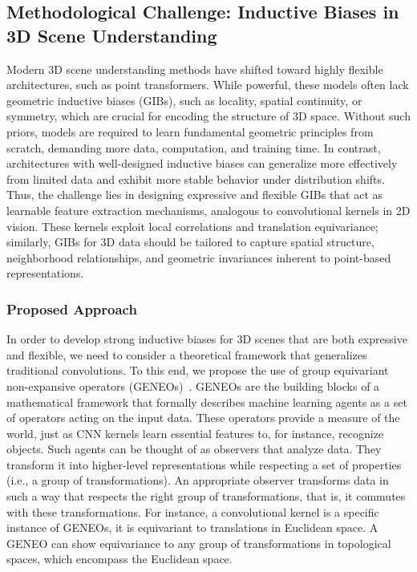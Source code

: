 \subsection{Methodological Challenge: Inductive Biases in 3D Scene Understanding}
%
Modern 3D scene understanding methods have shifted toward highly flexible
architectures, such as point transformers. While powerful, these models often
lack geometric inductive biases (GIBs), such as locality, spatial continuity,
or symmetry, which are crucial for encoding the structure of 3D space.
%
Without such priors, models are required to learn fundamental geometric
principles from scratch, demanding more data, computation, and training time.
In contrast, architectures with well-designed inductive biases can generalize
more effectively from limited data and exhibit more stable behavior under
distribution shifts.
%
Thus, the challenge lies in designing expressive and flexible GIBs that act as
learnable feature extraction mechanisms, analogous to convolutional kernels in
2D vision.
%
These kernels exploit local correlations and translation equivariance;
similarly, GIBs for 3D data should be tailored to capture spatial structure,
neighborhood relationships, and geometric invariances inherent to point-based
representations.

\subsubsection{Proposed Approach}
%
In order to develop strong inductive biases for 3D scenes that are both
expressive and flexible, we need to consider a theoretical framework that
generalizes traditional convolutions.
%
To this end, we propose the use of group equivariant non-expansive operators
(GENEOs)~\cite{bergomi2019towards,cascarano2021geometric}.
%
GENEOs are the building blocks of a mathematical framework that formally
describes machine learning agents as a set of operators acting on the input
data. These operators provide a measure of the world, just as CNN kernels learn
essential features to, for instance, recognize objects. Such agents can be
thought of as observers that analyze data. They transform it into higher-level
representations while respecting a set of properties (i.e., a group of
transformations). An appropriate observer transforms data in such a way that
respects the right group of transformations, that is, it commutes with these
transformations.
%
For instance, a convolutional kernel is a specific instance of GENEOs, it is
equivariant to translations in Euclidean space. A GENEO can show equivariance
to any group of transformations in topological spaces, which encompass the
Euclidean space.

